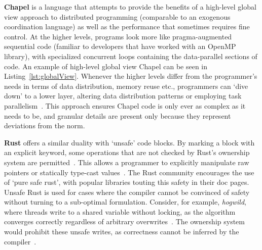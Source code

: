 \textbf{Chapel} is a language that attempts to provide the benefits of a high-level global view approach to distributed programming (comparable to an exogenous coordination language) as well as the performance that sometimes requires fine control. At the higher levels, programs look more like pragma-augmented sequential code (familiar to developers that have worked with an OpenMP library), with specialized concurrent loops containing the data-parallel sections of code. An example of high-level global view Chapel can be seen in Listing~\ref{lst:globalView}. Whenever the higher levels differ from the programmer's needs in terms of data distribution, memory reuse etc., programmers can `dive down' to a lower layer, altering data distribution patterns or employing task parallelism~\cite{chapel}. This approach ensures Chapel code is only ever as complex as it needs to be, and granular details are present only because they represent deviations from the norm. 






\textbf{Rust} offers a similar duality with `unsafe' code blocks. By marking a block with an explicit keyword, some operations that are not checked by Rust's ownership system are permitted~\cite{rustSystem}. This allows a programmer to explicitly manipulate raw pointers or statically type-cast values~\cite{patina}. The Rust community encourages the use of `pure safe rust', with popular libraries touting this safety in their doc pages. Unsafe Rust is used for cases where the compiler cannot be convinced of safety without turning to a sub-optimal formulation. Consider, for example, \textit{hogwild}, where threads write to a shared variable without locking, as the algorithm converges correctly regardless of arbitrary overwrites~\cite{hogwild}. The ownership system would prohibit these unsafe writes, as correctness cannot be inferred by the compiler~\cite{rustlang}.
